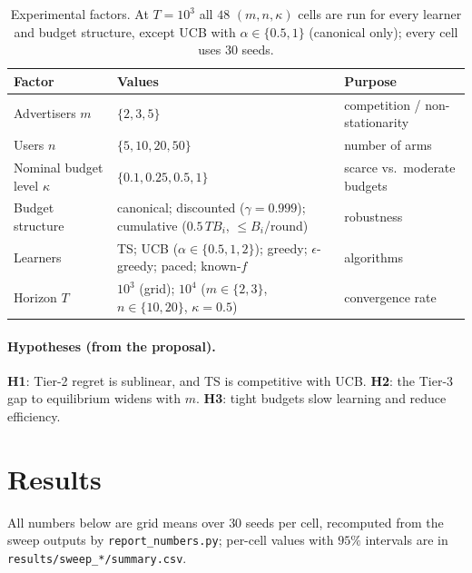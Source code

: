 \documentclass{article}
\theoremstyle{definition}
\begin{document}
\begin{table}[t]
\caption{Experimental factors. At $T=10^3$ all $48$ $(m,n,\kappa)$ cells are run for every learner and
budget structure, except UCB with $\alpha\in\{0.5,1\}$ (canonical only); every cell uses $30$ seeds.}\label{tab:design}
\centering\small
\begin{tabularx}{\linewidth}{@{}lXl@{}}
\toprule
Factor & Values & Purpose\\
\midrule
Advertisers $m$ & $\{2,3,5\}$ & competition / non-stationarity\\
Users $n$ & $\{5,10,20,50\}$ & number of arms\\
Nominal budget level $\kappa$ & $\{0.1,0.25,0.5,1\}$ & scarce vs.\ moderate budgets\\
Budget structure & canonical; discounted ($\gamma=0.999$); cumulative ($0.5\,TB_i$, $\le B_i$/round) & robustness\\
Learners & TS; UCB ($\alpha\in\{0.5,1,2\}$); greedy; $\epsilon$-greedy; paced; known-$f$ & algorithms\\
Horizon $T$ & $10^3$ (grid); $10^4$ ($m\in\{2,3\}$, $n\in\{10,20\}$, $\kappa=0.5$) & convergence rate\\
\bottomrule
\end{tabularx}
\end{table}

\paragraph{Hypotheses (from the proposal).} \textbf{H1}: Tier-2 regret is sublinear, and TS is competitive
with UCB. \textbf{H2}: the Tier-3 gap to equilibrium widens with $m$. \textbf{H3}: tight budgets slow
learning and reduce efficiency.

\section{Results}\label{sec:results}
All numbers below are grid means over $30$ seeds per cell, recomputed from the sweep outputs by
\texttt{report\_numbers.py}; per-cell values with $95\%$ intervals are in
\texttt{results/sweep\_*/summary.csv}.
\end{document}
